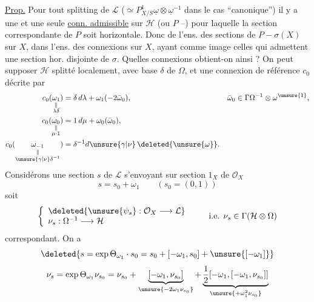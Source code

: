 \uline{Prop.} Pour tout splitting de  $\mathcal{L}$ ($\simeq P^1_{X/S}\underline{\omega}\otimes\underline{\omega}^{-1}$ dans le cas ``canonique'') il y a une et une seule \uline{conn. admissible} sur $\mathcal{H}$ (ou $P$ --) pour laquelle la section correspondante de $P$ soit horizontale. Donc    de l'ens. des sections de $P-\sigma(X)$ sur $X$,  dans l'ens. des connexions  sur $X$, ayant comme image celles qui admettent une section hor. disjointe de $\sigma$.
Quelles connexions  obtient-on ainsi ?
On peut supposer $\mathcal{H}$ splitté localement, avec base $\delta$ de $\Omega$, et une connexion de référence $c_0$ décrite par
\[
\begin{aligned}
c_0(\underset{\substack{\Vert\\\lambda\delta}}{\omega_1})&=\delta\,d\lambda+\omega_1(-2\bar\omega_0),&\bar\omega_0&\in\Gamma\Omega^{-1}\otimes\omega^{\unsure{1}},\\
c_0(\underset{\substack{\Vert\\\mu\cdot1}}{\omega_0})&=1\,d\mu+\omega_0(\bar\omega_0),\\
c_0(\underset{\substack{\Vert\\\unsure{\gamma|\nu}\delta^{-1}}}{\omega_{-1}})&=\delta^{-1}d\unsure{\gamma|\nu}\,\deleted{\unsure{\omega}}.
\end{aligned}
\]
Considérons une section $s$ de $\mathcal{L}$ s'envoyant sur section $1_X$ de $\mathcal{O}_X$
\[
s=s_0+\omega_1\qquad(s_0=(0,1))
\]
soit
\[
\left\{\begin{array}{l}
\deleted{\unsure{\psi_s}:\mathcal{O}_X\longrightarrow\mathcal{L}}\\
\nu_s:\Omega^{-1}\longrightarrow\mathcal{H}
\end{array}\right.
\qquad\text{i.e. }\nu_s\in\Gamma(\mathcal{H}\otimes\Omega)
\]
 correspondant.  On a
\[
\deleted{s=\exp\Theta_{\omega_1}\cdot s_0=s_0+[-\omega_1,s_0]+\unsure{[-\omega_1]}}
\]
\[
\nu_s=\exp\Theta_{\omega_1}\nu_{s_0}
=\nu_{s_0}+\underbrace{[-\omega_1,\nu_{s_0}]}_{\unsure{-2\omega_1\nu_{s_0}}}
+\underbrace{\frac12[-\omega_1,[-\omega_1,\nu_{s_0}]]}_{\unsure{+\omega_1^2\nu_{s_0}}}
\]
